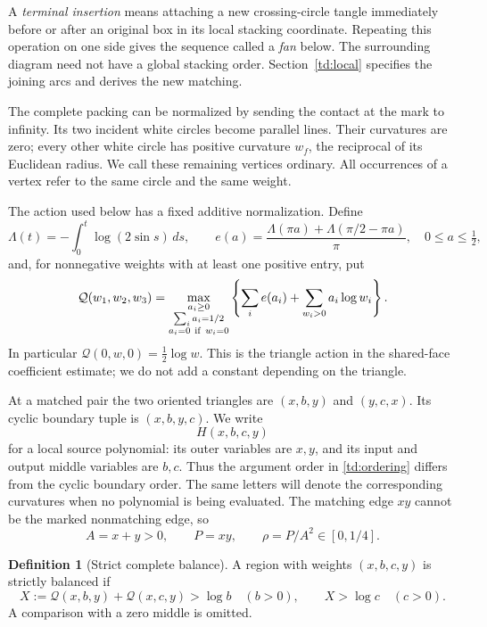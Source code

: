 \documentclass[11pt]{article}
\numberwithin{equation}{section}
\theoremstyle{definition}
\newtheorem{definition}[theorem]{Definition}
\newcommand{\calQ}{\mathcal Q}
\begin{document}
A \emph{terminal insertion} means attaching a new crossing-circle
tangle immediately before or after an original box in its local
stacking coordinate. Repeating this operation on one side gives the
sequence called a \emph{fan} below. The surrounding diagram need not
have a global stacking order. Section~\ref{td:local} specifies the
joining arcs and derives the new matching.

The complete packing can be normalized by sending the contact at
the mark to infinity. Its two incident white circles become
parallel lines. Their curvatures are zero; every other white circle
has positive curvature \(w_f\), the reciprocal of its Euclidean
radius. We call these remaining vertices ordinary. All occurrences
of a vertex refer to the same circle and the same weight.

The action used below has a fixed additive normalization. Define
\[
 \Lambda(t)=-\int_0^t\log(2\sin s)\,ds,\qquad
 e(a)=\frac{\Lambda(\pi a)+\Lambda(\pi/2-\pi a)}{\pi},
 \quad 0\le a\le\tfrac12 ,
\]
and, for nonnegative weights with at least one positive entry, put
\begin{equation}\label{td:entropy}
 \calQ(w_1,w_2,w_3)=
 \max_{\substack{a_i\ge0\\\sum_i a_i=1/2\\a_i=0\ {\rm if}\ w_i=0}}
       \left\{\sum_i e(a_i)+\sum_{w_i>0}a_i\log w_i\right\}.
\end{equation}
In particular \(\calQ(0,w,0)=\frac12\log w\).
This is the triangle action in the shared-face coefficient estimate;
we do not add a constant depending on the triangle.

At a matched pair the two oriented triangles are
\((x,b,y)\) and \((y,c,x)\). Its cyclic boundary tuple is
\((x,b,y,c)\). We write
\begin{equation}\label{td:ordering}
 H(x,b,c,y)
\end{equation}
for a local source polynomial: its outer variables are \(x,y\),
and its input and output middle variables are \(b,c\).
Thus the argument order in \eqref{td:ordering} differs from the
cyclic boundary order. The same letters will denote the corresponding
curvatures when no polynomial is being evaluated.
The matching edge \(xy\) cannot be the marked nonmatching edge, so
\begin{equation}\label{td:outer}
 A=x+y>0,\qquad P=xy,\qquad \rho=P/A^2\in[0,1/4].
\end{equation}

\begin{definition}[Strict complete balance]\label{td:balance}
A region with weights \((x,b,c,y)\) is strictly balanced if
\[
 X:=\calQ(x,b,y)+\calQ(x,c,y)>\log b\quad(b>0),\qquad
 X>\log c\quad(c>0).
\]
A comparison with a zero middle is omitted.
\end{definition}
\end{document}
